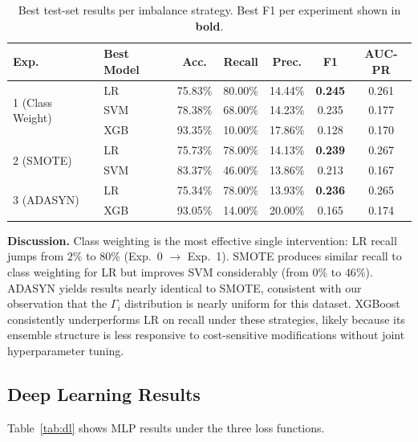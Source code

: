 \documentclass[11pt,a4paper]{article}
\begin{document}
\begin{table}[H]
  \centering
  \caption{Best test-set results per imbalance strategy. Best F1 per experiment shown in \textbf{bold}.}
  \label{tab:imbalance}
  \renewcommand{\arraystretch}{1.15}
  \begin{tabular}{llccccc}
    \toprule
    \textbf{Exp.} & \textbf{Best Model} & \textbf{Acc.} & \textbf{Recall} & \textbf{Prec.} & \textbf{F1} & \textbf{AUC-PR} \\
    \midrule
    \multirow{3}{*}{1 (Class Weight)} & LR  & 75.83\% & 80.00\% & 14.44\% & \textbf{0.245} & 0.261 \\
                                       & SVM & 78.38\% & 68.00\% & 14.23\% & 0.235 & 0.177 \\
                                       & XGB & 93.35\% & 10.00\% & 17.86\% & 0.128 & 0.170 \\
    \midrule
    \multirow{2}{*}{2 (SMOTE)}        & LR  & 75.73\% & 78.00\% & 14.13\% & \textbf{0.239} & 0.267 \\
                                       & SVM & 83.37\% & 46.00\% & 13.86\% & 0.213 & 0.167 \\
    \midrule
    \multirow{2}{*}{3 (ADASYN)}       & LR  & 75.34\% & 78.00\% & 13.93\% & \textbf{0.236} & 0.265 \\
                                       & XGB & 93.05\% & 14.00\% & 20.00\% & 0.165 & 0.174 \\
    \bottomrule
  \end{tabular}
\end{table}

\textbf{Discussion.}
Class weighting is the most effective single intervention: LR recall jumps from $2\%$ to $80\%$ (Exp.\ 0 $\to$ Exp.\ 1).
SMOTE produces similar recall to class weighting for LR but improves SVM considerably (from $0\%$ to $46\%$).
ADASYN yields results nearly identical to SMOTE, consistent with our observation that the $\Gamma_i$ distribution is nearly uniform for this dataset.
XGBoost consistently underperforms LR on recall under these strategies, likely because its ensemble structure is less responsive to cost-sensitive modifications without joint hyperparameter tuning.

\subsection{Deep Learning Results}

Table~\ref{tab:dl} shows MLP results under the three loss functions.
\end{document}
